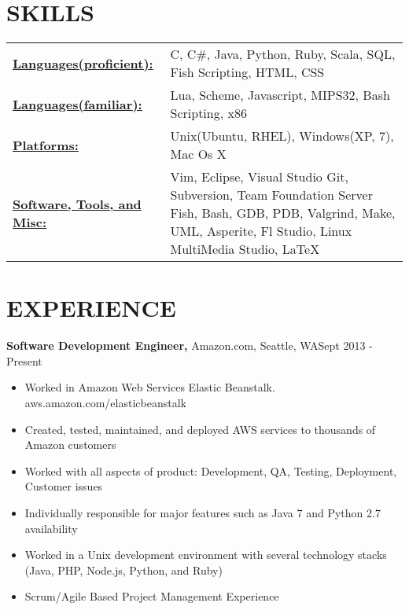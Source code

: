 \documentclass{res}
\begin{document}
 
\address{2226 Elliott Ave Apt 113, Seattle, WA 98121 (928) 284-5522 Charliec364@gmail.com }


\begin{resume}
\footnotesize

\section{SKILLS}
   \begin{tabular}{l p{3in}}
     \underline{\bf Languages(proficient):} & C, C\#, Java, Python, Ruby, Scala, SQL, Fish Scripting, HTML, CSS \\
     \underline{\bf Languages(familiar):} & Lua, Scheme, Javascript, MIPS32, Bash Scripting, x86 \\
     \underline{\bf Platforms:} & Unix(Ubuntu, RHEL), Windows(XP, 7), Mac Os X \\
     \underline{\bf Software, Tools, and Misc:} &  Vim, Eclipse, Visual Studio
                        Git, Subversion, Team Foundation Server
                        Fish, Bash, GDB, PDB, Valgrind, Make, 
                        UML, Asperite, Fl Studio, Linux MultiMedia Studio, \LaTeX\
 \end{tabular}
 
\section{EXPERIENCE}
  {\bf Software Development Engineer,} Amazon.com, Seattle, WA\hfill Sept 2013 - Present
  \begin{itemize} \itemsep -2pt  %
    \item Worked in Amazon Web Services Elastic Beanstalk. aws.amazon.com/elasticbeanstalk
    \item Created, tested, maintained, and deployed AWS services to thousands of Amazon customers
    \item Worked with all aspects of product: Development, QA, Testing, Deployment, Customer issues
    \item Individually responsible for major features such as Java 7 and Python 2.7 availability
    \item Worked in a Unix development environment with several technology stacks (Java, PHP, Node.js, Python, and Ruby)
    \item Scrum/Agile Based Project Management Experience
  \end{itemize}


\end{resume}
\end{document}
